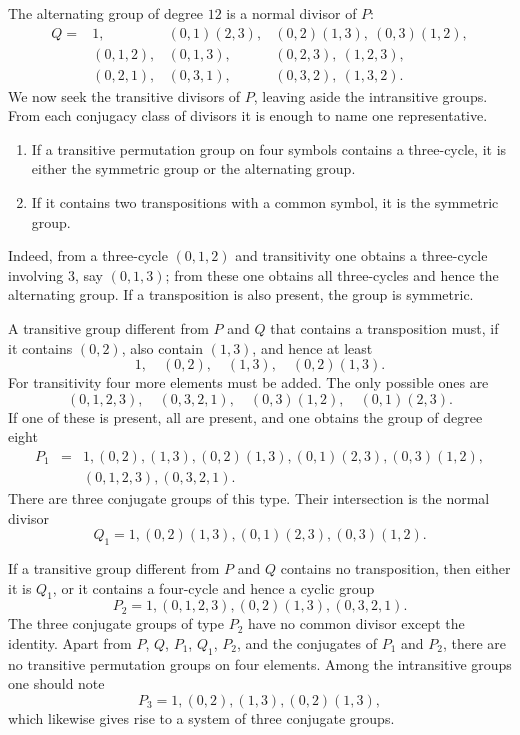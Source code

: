 \documentclass[11pt]{article}
\begin{document}
The alternating group of degree $12$ is a normal divisor of $P$:
\[
\begin{array}{llll}
Q=&1,&(0,1)(2,3),&(0,2)(1,3),\ (0,3)(1,2),\\
 &(0,1,2),&(0,1,3),&(0,2,3),\ (1,2,3),\\
 &(0,2,1),&(0,3,1),&(0,3,2),\ (1,3,2).
\end{array}
\tag{2}
\]
We now seek the transitive divisors of $P$, leaving aside the intransitive groups. From each conjugacy class of divisors it is enough to name one representative.

\begin{enumerate}[label=\arabic*.,leftmargin=2em]
\item If a transitive permutation group on four symbols contains a three-cycle, it is either the symmetric group or the alternating group.
\item If it contains two transpositions with a common symbol, it is the symmetric group.
\end{enumerate}

Indeed, from a three-cycle $(0,1,2)$ and transitivity one obtains a three-cycle involving $3$, say $(0,1,3)$; from these one obtains all three-cycles and hence the alternating group. If a transposition is also present, the group is symmetric.

A transitive group different from $P$ and $Q$ that contains a transposition must, if it contains $(0,2)$, also contain $(1,3)$, and hence at least
\[
        1,
\quad (0,2),
\quad (1,3),
\quad (0,2)(1,3).
\tag{3}
\]
For transitivity four more elements must be added. The only possible ones are
\[
        (0,1,2,3),
\quad (0,3,2,1),
\quad (0,3)(1,2),
\quad (0,1)(2,3).
\tag{4}
\]
If one of these is present, all are present, and one obtains the group of degree eight
\[
\begin{array}{rcl}
P_1&=&1,
(0,2),
(1,3),
(0,2)(1,3),
(0,1)(2,3),
(0,3)(1,2),\\[0.2em]
&& (0,1,2,3),
(0,3,2,1).
\end{array}
\tag{5}
\]
There are three conjugate groups of this type. Their intersection is the normal divisor
\[
        Q_1=1,
(0,2)(1,3),
(0,1)(2,3),
(0,3)(1,2).
\tag{6}
\]

If a transitive group different from $P$ and $Q$ contains no transposition, then either it is $Q_1$, or it contains a four-cycle and hence a cyclic group
\[
        P_2=1,
(0,1,2,3),
(0,2)(1,3),
(0,3,2,1).
\tag{7}
\]
The three conjugate groups of type $P_2$ have no common divisor except the identity. Apart from $P$, $Q$, $P_1$, $Q_1$, $P_2$, and the conjugates of $P_1$ and $P_2$, there are no transitive permutation groups on four elements. Among the intransitive groups one should note
\[
        P_3=1,
(0,2),
(1,3),
(0,2)(1,3),
\]
which likewise gives rise to a system of three conjugate groups.
\end{document}
